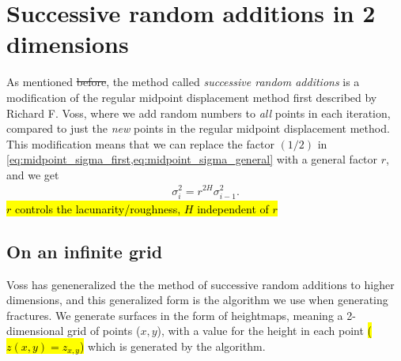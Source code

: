 \section{Successive random additions in 2 dimensions}
As mentioned \st{before}, the method called \emph{successive random additions} is a modification of the regular midpoint displacement method first described by Richard F. Voss\cite{voss1985random}, where we add random numbers to \emph{all} points in each iteration, compared to just the \emph{new} points in the regular midpoint displacement method. This modification means that we can replace the factor $(1/2)$ in \cref{eq:midpoint_sigma_first,eq:midpoint_sigma_general} with a general factor $r$, and we get
\begin{align*}
    \sigma_i^2 = r^{2H}\sigma^2_{i-1}.
\end{align*}
\hl{$r$ controls the lacunarity/roughness, $H$ independent of $r$}

\subsection{On an infinite grid}
Voss has geneneralized the the method of successive random additions to higher dimensions\cite{voss1985random}, and this generalized form is the algorithm we use when generating fractures. We generate surfaces in the form of heightmaps, meaning a 2-dimensional grid of points ({$x,y$}), with a value for the height in each point \hl{($z(x,y) = z_{x,y}$)} which is generated by the algorithm.

